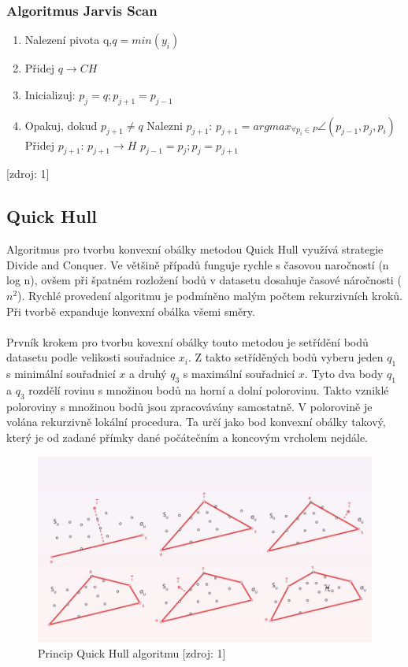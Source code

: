 \documentclass[a4paper, 12pt]{article}
\begin{document}
\subsubsection{Algoritmus Jarvis Scan}
\begin{enumerate}
\item Nalezení pivota q,$ q = min(y_i) $ 
\item Přidej $ q \rightarrow CH  $ 
\item Inicializuj: $p_j = q; p_{j+1} = p_{j-1}$
\item Opakuj, dokud $ p_{j+1} \ne q $
\subitem Nalezni $p_{j+1}$: $ p_{j+1} = arg  max_{\forall p_i \in P}  \angle (p_{j-1}, p_j, p_i)$
\subitem Přidej $p_{j+1}$: $ p_{j+1} \rightarrow H  $
\subitem $ p_{j-1} = p_j; p_j = p_{j+1}  $
\end{enumerate}[zdroj: 1]


\subsection{Quick Hull}
Algoritmus pro tvorbu konvexní obálky metodou Quick Hull využívá strategie Divide and Conquer. Ve většině případů funguje rychle s časovou naročností (n log n), ovšem při špatném rozložení bodů v datasetu dosahuje časové náročnosti ($n^2$). Rychlé provedení algoritmu je podmíněno malým počtem rekurzivních kroků. Při tvorbě expanduje konvexní obálka všemi směry. \\
\\
Prvník krokem pro tvorbu kovexní obálky touto metodou je setřídění bodů datasetu podle velikosti souřadnice \textit{$x_i$}. Z takto setříděných bodů vyberu jeden \textit{$q_1$} s minimální souřadnicí \textit{$x$} a druhý \textit{$q_3$} s maximální souřadnicí \textit{$x$}.
Tyto dva body \textit{$q_1$} a \textit{$q_3$} rozdělí rovinu s množinou bodů na horní a dolní polorovinu. Takto vzniklé poloroviny s množinou bodů jsou zpracovávány samostatně. V polorovině je volána rekurzivně lokální procedura. Ta určí jako bod konvexní obálky takový, který je od zadané přímky dané počátečním a koncovým vrcholem nejdále.

\begin{figure}[h!]
	\centering
	\includegraphics[width=12cm]{quickhull.jpg}
	\caption{Princip Quick Hull algoritmu [zdroj: 1]}
\end{figure}
\end{document}
